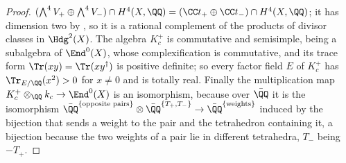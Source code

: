 \begin{proof}
$(\bigwedge^{4}V_{+}\oplus\bigwedge^{4}V_{-})\cap H^{4}(X,\QQ)
=(\CC t_{+}\oplus\CC t_{-})\cap H^{4}(X,\QQ)$; it has dimension two by
\cite[Proposition~3.7(i)]{paperI}, so it is a rational complement of the products of
divisor classes in $\Hdg^{2}(X)$. The algebra $K_{c}^{+}$ is commutative and
semisimple, being a subalgebra of $\End^{0}(X)$, whose complexification is
commutative, and its trace form $\Tr(xy)=\Tr(xy^{\dagger})$ is positive
definite; so every factor field $E$ of $K_{c}^{+}$ has
$\Tr_{E/\QQ}(x^{2})>0$ for $x\ne0$ and is totally real. Finally the
multiplication map $K_{c}^{+}\otimes_{\QQ}k_{c}\to\End^{0}(X)$ is an
isomorphism, because over $\bar{\QQ}$ it is the isomorphism
$\bar{\QQ}^{\{\text{opposite pairs}\}}\otimes\bar{\QQ}^{\{T_{+},T_{-}\}}
\to\bar{\QQ}^{\{\text{weights}\}}$ induced by the bijection that sends a
weight to the pair and the tetrahedron containing it, a bijection because
the two weights of a pair lie in different tetrahedra, $T_{-}$ being $-T_{+}$.


\end{proof}
